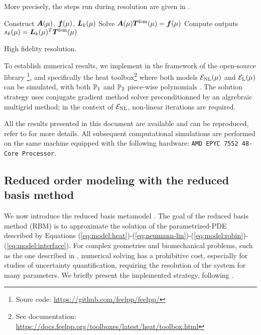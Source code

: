 More precisely, the steps run during resolution are given in .

\begin{algorithm}
    \KwIn{$\mu\in\Dmu$}
    Construct $\mat{A}(\mu)$, $\vct{f}(\mu)$, $\vct{L}_k(\mu)$\;
    Solve $\mat{A}(\mu)\vct{T}^\fem(\mu) = \vct{f}(\mu)$\;
    Compute outputs $s_k(\mu) = \vct{L}_k(\mu)^T\vct{T}^\fem(\mu)$\;
    \caption{High fidelity resolution.}
    \label{algo:hf}
\end{algorithm}


To establish numerical results, we implement  in the framework of the open-source library \fpp{} \cite{christophe_prud_homme_2023_8272196}\footnote{Soure code: \url{https://github.com/feelpp/feelpp/}},
and specifically the \textsf{heat} toolbox\footnote{See documentation: \url{https://docs.feelpp.org/toolboxes/latest/heat/toolbox.html}}
where both models $\Em_\text{NL}(\mu)$ and $\Em_\text{L}(\mu)$ can be simulated, with both $\P_1$ and $\P_2$ piece-wise polynomials \cite{Ern2021-mi}.
The solution strategy uses conjugate gradient method solver preconditionned by an algrebraic multigrid method; in the context of $\Em_\text{NL}$, non-linear iterations are required.


All the results presented in this document are available and can be reproduced, refer to  for more details.
All subsequent computational simulations are performed on the same machine equipped with the following hardware: \texttt{AMD EPYC 7552 48-Core Processor}.





\subsection{Reduced order modeling with the reduced basis method}
\label{sec:rbm}

We now introduce the reduced basis metamodel \cite{10.1115/1.1448332, Rozza2008-hx, Quarteroni2016}.
The goal of the reduced basis method (RBM) is to approximate the solution of the parametrized-PDE described by Equations (\ref{eq:model:heat})-(\ref{eq:neumann-lin})-(\ref{eq:model:robin})-(\ref{eq:model:interface}).
For complex geometries and biomechanical problems, such as the one described in , numerical solving has a prohibitive cost, especially for studies of uncertainty quantification, requiring the resolution of the system for many parameters.
We briefly present the implemented strategy, following \cite{10.1115/1.1448332}.

